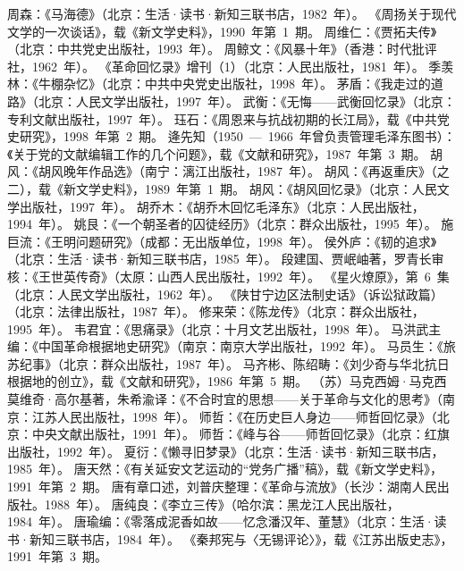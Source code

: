 \begin{thebibliography}{999}
\bibitem{}周森：《马海德》（北京：生活·读书·新知三联书店，1982~年）。
\bibitem{}《周扬关于现代文学的一次谈话》，载《新文学史料》，1990~年第~1~期。
\bibitem{}周维仁：《贾拓夫传》（北京：中共党史出版社，1993~年）。
\bibitem{}周鲸文：《风暴十年》（香港：时代批评社，1962~年）。
\bibitem{}《革命回忆录》增刊（1）（北京：人民出版社，1981~年）。
\bibitem{}季羡林：《牛棚杂忆》（北京：中共中央党史出版社，1998~年）。
\bibitem{}茅盾：《我走过的道路》（北京：人民文学出版社，1997~年）。
\bibitem{}武衡：《无悔——武衡回忆录》（北京：专利文献出版社，1997~年）。
\bibitem{}珏石：《周恩来与抗战初期的长江局》，载《中共党史研究》，1998~年第~2~期。
\bibitem{}逄先知（1950~—~1966~年曾负责管理毛泽东图书）：《关于党的文献编辑工作的几个问题》，载《文献和研究》，1987~年第~3~期。
\bibitem{}胡风：《胡风晚年作品选》（南宁：漓江出版社，1987~年）。
\bibitem{}胡风：《再返重庆》（之二），载《新文学史料》，1989~年第~1~期。
\bibitem{}胡风：《胡风回忆录》（北京：人民文学出版社，1997~年）。
\bibitem{}胡乔木：《胡乔木回忆毛泽东》（北京：人民出版社，1994~年）。
\bibitem{}姚艮：《一个朝圣者的囚徒经历》（北京：群众出版社，1995~年）。
\bibitem{}施巨流：《王明问题研究》（成都：无出版单位，1998~年）。
\bibitem{}侯外庐：《韧的追求》（北京：生活·读书·新知三联书店，1985~年）。
\bibitem{}段建国、贾岷岫著，罗青长审核：《王世英传奇》（太原：山西人民出版社，1992~年）。
\bibitem{}《星火燎原》，第~6~集（北京：人民文学出版社，1962~年）。
\bibitem{}《陕甘宁边区法制史话》（诉讼狱政篇）（北京：法律出版社，1987~年）。
\bibitem{}修来荣：《陈龙传》（北京：群众出版社，1995~年）。
\bibitem{}韦君宜：《思痛录》（北京：十月文艺出版社，1998~年）。
\bibitem{}马洪武主编：《中国革命根据地史研究》（南京：南京大学出版社，1992~年）。
\bibitem{}马员生：《旅苏纪事》（北京：群众出版社，1987~年）。
\bibitem{}马齐彬、陈绍畴：《刘少奇与华北抗日根据地的创立》，载《文献和研究》，1986~年第~5~期。
\bibitem{}（苏）马克西姆·马克西莫维奇·高尔基著，朱希渝译：《不合时宜的思想——关于革命与文化的思考》（南京：江苏人民出版社，1998~年）。
\bibitem{}师哲：《在历史巨人身边——师哲回忆录》（北京：中央文献出版社，1991~年）。
\bibitem{}师哲：《峰与谷——师哲回忆录》（北京：红旗出版社，1992~年）。
\bibitem{}夏衍：《懒寻旧梦录》（北京：生活·读书·新知三联书店，1985~年）。
\bibitem{}唐天然：《有关延安文艺运动的“党务广播”稿》，载《新文学史料》，1991~年第~2~期。
\bibitem{}唐有章口述，刘普庆整理：《革命与流放》（长沙：湖南人民出版社。1988~年）。
\bibitem{}唐纯良：《李立三传》（哈尔滨：黑龙江人民出版社，1984~年）。
\bibitem{}唐瑜编：《零落成泥香如故——忆念潘汉年、董慧》（北京：生活·读书·新知三联书店，1984~年）。
\bibitem{}《秦邦宪与〈无锡评论〉》，载《江苏出版史志》，1991~年第~3~期。

\end{thebibliography}
